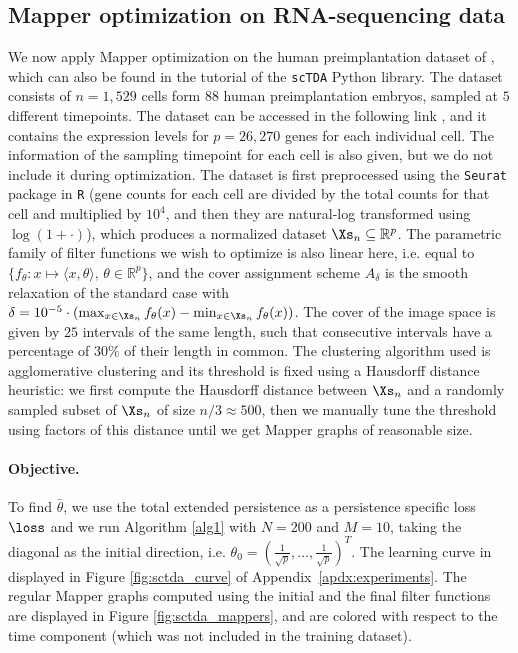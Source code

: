 \subsection{Mapper optimization on RNA-sequencing data}
\label{subsec:single-cell}


We now apply Mapper optimization on the human preimplantation dataset of \cite{petropoulos2016single}, which can also be found in the tutorial of the \texttt{scTDA} Python library. The dataset consists of $n=1,529$ cells form $88$ human preimplantation embryos, sampled at $5$ different timepoints. The dataset can be accessed in the following link \cite{sctda}, and it contains the expression levels for $p=26,270$ genes for each individual cell. The information of the sampling timepoint for each cell is also given, but we do not include it during optimization. The dataset is first preprocessed using the \texttt{Seurat} package in \texttt{R} (gene counts for each cell are divided by the total counts for that cell and multiplied by $10^4$, and then they are natural-log transformed using $\log(1+\cdot)$), which produces a normalized dataset $\Xs_n\subseteq\mathbb{R}^p$.
The parametric family of filter functions we wish to optimize is also linear here, i.e. equal to $\{f_\theta\colon x\mapsto\langle x,\theta \rangle,\,\theta\in\mathbb{R}^p\}$, and the cover assignment scheme $A_\delta$ is the smooth relaxation of the standard case with $\delta=10^{-5}\cdot(\max_{x\in\Xs_n}f_\theta(x)-\min_{x\in\Xs_n}f_\theta(x))$. The cover of the image space is given by $25$ intervals of the same length, such that consecutive intervals have a percentage of $30\%$ of their length in common. The clustering algorithm used is agglomerative clustering and its threshold is fixed using a Hausdorff distance heuristic: we first compute the Hausdorff distance between $\Xs_n$ and a randomly sampled subset of $\Xs_n$ of size $ n/3\approx500$, then we manually tune the threshold using factors of this distance until we get Mapper graphs of reasonable size.

\paragraph*{Objective.} To find $\bar\theta$, we use the total extended persistence as a persistence specific loss $\loss$ and we run Algorithm \ref{alg1} with $N=200$ and $M=10$, taking the diagonal as the initial direction, i.e. $\theta_0=(\frac{1}{\sqrt{p}},...,\frac{1}{\sqrt{p}})^T$. The learning curve in displayed in Figure \ref{fig:sctda_curve} of Appendix~\ref{apdx:experiments}.
The regular Mapper graphs computed using the initial and the final filter functions are displayed in Figure \ref{fig:sctda_mappers}, and are colored with respect to the time component (which was not included in the training dataset).

